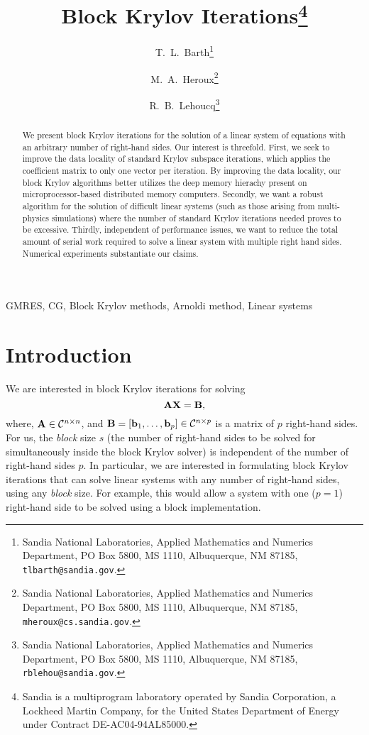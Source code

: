\documentclass[twoside]{siamltex}
\title{Block Krylov Iterations\thanks{Sandia is a multiprogram
laboratory operated by Sandia Corporation, a Lockheed Martin
Company, for the United States Department of Energy under Contract
DE-AC04-94AL85000.}}
\author{T.~L.~Barth\thanks{Sandia National Laboratories, Applied Mathematics and Numerics Department,
 PO Box 5800, MS 1110,
 Albuquerque, NM 87185, {\tt tlbarth@sandia.gov}.}
 \and
M.~A.~Heroux\thanks{Sandia National Laboratories, Applied
Mathematics and Numerics Department, PO Box 5800, MS 1110,
Albuquerque, NM 87185, {\tt mheroux@cs.sandia.gov}.}
 \and
 R.~B.~Lehoucq\thanks{Sandia National Laboratories, Applied Mathematics
and Numerics Department,
 PO Box 5800, MS 1110,
Albuquerque, NM 87185, {\tt rblehou@sandia.gov}.
}
}
\newcommand{\bA}{{\bf A}}
\newcommand{\bB}{{\bf B}}
\newcommand{\bX}{{\bf X}}
\newcommand{\bb}{{\bf b}}
\newcommand{\eq}{\begin{equation}}
\newcommand{\eeq}{\end{equation}}
\begin{document}
\maketitle

\begin{abstract}
We present block Krylov iterations for the solution of a linear
system of equations with an arbitrary number of right-hand sides.
Our interest is threefold.  First, we seek to improve the data
locality of standard Krylov subspace iterations, which applies the
coefficient matrix to only one vector per iteration. By improving
the data locality, our block Krylov algorithms better utilizes the
deep memory hierachy present on microprocessor-based distributed
memory computers.  Secondly, we want a robust algorithm for the
solution of difficult linear systems (such as those arising from
multi-physics simulations) where the number of standard Krylov
iterations needed proves to be excessive.  Thirdly, independent of
performance issues, we want to reduce the total amount of serial
work required to solve a linear system with multiple right hand
sides. Numerical experiments substantiate our claims.

\end{abstract}

\begin{keywords}
GMRES, CG, Block Krylov methods, Arnoldi method, Linear systems
\end{keywords}
\begin{AMS}

\end{AMS}

\section{Introduction}
\label{intro}

We are interested in block Krylov iterations for solving
 \eq
 \bA \bX = \bB,
 \label{eq:blocklinsys}
 \eeq
where, $\bA \in {\cal C}^{n \times n}$, and $\bB = [\bb_1, \ldots,
\bb_p] \in {\cal C}^{n \times p}$ is a matrix of $p$ right-hand
sides. For us, the {\em block} size $s$ (the number of right-hand
sides to be solved for simultaneously inside the block Krylov
solver) is independent of the number of right-hand sides $p$. In
particular, we are interested in formulating block Krylov
iterations that can solve linear systems with any number of
right-hand sides, using any {\em block} size. For example, this
would allow a system with one ($p=1$) right-hand side to be solved
using a block implementation.
\end{document}
